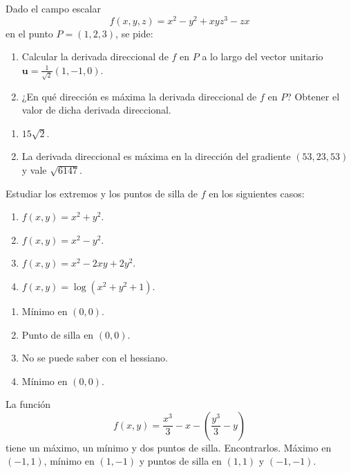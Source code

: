 {Dado el campo escalar 
\[
f(x,y,z) = x^2-y^2+xyz^3-zx
\]
en el punto $P=(1,2,3)$, se pide:
\begin{enumerate}
\item Calcular la derivada direccional de $f$ en $P$ a lo largo del vector unitario $\mathbf{u}=\frac{1}{\sqrt2}(1,-1,0)$.
\item ¿En qué dirección es máxima la derivada direccional de $f$ en $P$? Obtener el valor de dicha derivada direccional.
\end{enumerate} 
}
{\begin{enumerate}
\item $15\sqrt{2}$.
\item La derivada direccional es máxima en la dirección del gradiente $(53,23,53)$ y vale $\sqrt{6147}$.
\end{enumerate}
}
{
}


{Estudiar los extremos y los puntos de silla de $f$ en los siguientes casos:
\begin{enumerate}
\item $f(x,y) = x^2+y^2$.
\item $f(x,y) = x^2-y^2$.
\item $f(x,y) = x^2-2xy+2y^2$.
\item $f(x,y) = \log(x^2+y^2+1)$.
\end{enumerate}
}
{\begin{enumerate}
\item Mínimo en $(0,0)$.
\item Punto de silla en $(0,0)$.
\item No se puede saber con el hessiano.
\item Mínimo en $(0,0)$.
\end{enumerate} 
}
{
}


{La función 
\[
f(x,y) = \frac{x^3}{3}-x-\left(\frac{y^3}{3}-y\right)
\]
tiene un máximo, un mínimo y dos puntos de silla. Encontrarlos.
}
{Máximo en $(-1,1)$, mínimo en $(1,-1)$ y puntos de silla en $(1,1)$ y $(-1,-1)$.
}
{
}